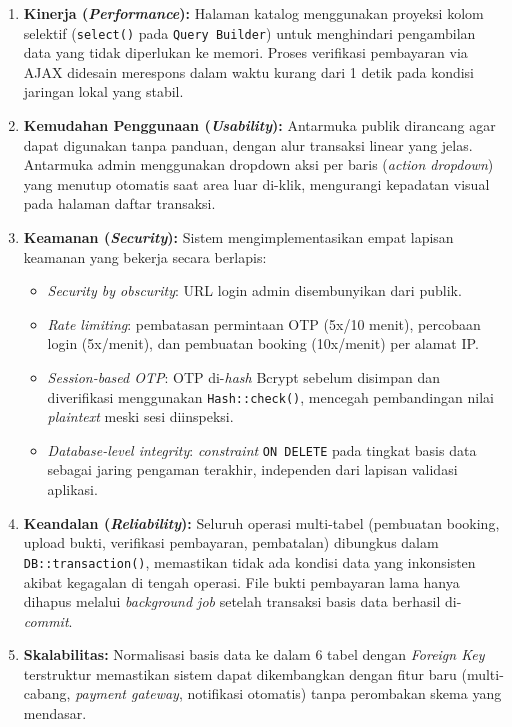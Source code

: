 \documentclass[11pt, a5paper]{article}
\begin{document}
\begin{enumerate}[label=\alph*.]
  \item \textbf{Kinerja (\textit{Performance}):} Halaman katalog menggunakan
        proyeksi kolom selektif (\texttt{select()} pada \texttt{Query Builder})
        untuk menghindari pengambilan data yang tidak diperlukan ke memori. Proses
        verifikasi pembayaran via AJAX didesain merespons dalam waktu kurang dari
        1 detik pada kondisi jaringan lokal yang stabil.

  \item \textbf{Kemudahan Penggunaan (\textit{Usability}):} Antarmuka publik
        dirancang agar dapat digunakan tanpa panduan, dengan alur transaksi
        linear yang jelas. Antarmuka admin menggunakan dropdown aksi per baris
        (\textit{action dropdown}) yang menutup otomatis saat area luar di-klik,
        mengurangi kepadatan visual pada halaman daftar transaksi.

  \item \textbf{Keamanan (\textit{Security}):} Sistem mengimplementasikan empat
        lapisan keamanan yang bekerja secara berlapis:
        \begin{itemize}
          \item \textit{Security by obscurity}: URL login admin disembunyikan dari
                publik.
          \item \textit{Rate limiting}: pembatasan permintaan OTP (5x/10 menit),
                percobaan login (5x/menit), dan pembuatan booking (10x/menit) per
                alamat IP.
          \item \textit{Session-based OTP}: OTP di-\textit{hash} Bcrypt sebelum
                disimpan dan diverifikasi menggunakan \texttt{Hash::check()},
                mencegah pembandingan nilai \textit{plaintext} meski sesi
                diinspeksi.
          \item \textit{Database-level integrity}: \textit{constraint}
                \texttt{ON DELETE} pada tingkat basis data sebagai jaring pengaman
                terakhir, independen dari lapisan validasi aplikasi.
        \end{itemize}

  \item \textbf{Keandalan (\textit{Reliability}):} Seluruh operasi multi-tabel
        (pembuatan booking, upload bukti, verifikasi pembayaran, pembatalan)
        dibungkus dalam \texttt{DB::transaction()}, memastikan tidak ada kondisi
        data yang inkonsisten akibat kegagalan di tengah operasi. File bukti
        pembayaran lama hanya dihapus melalui \textit{background job} setelah
        transaksi basis data berhasil di-\textit{commit}.

  \item \textbf{Skalabilitas:} Normalisasi basis data ke dalam 6 tabel dengan
        \textit{Foreign Key} terstruktur memastikan sistem dapat dikembangkan
        dengan fitur baru (multi-cabang, \textit{payment gateway}, notifikasi
        otomatis) tanpa perombakan skema yang mendasar.
\end{enumerate}
\end{document}
